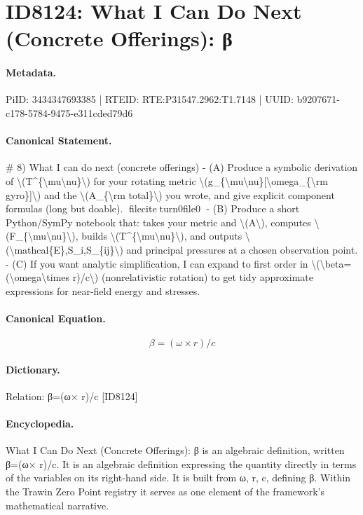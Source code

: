 \section*{ID8124: What I Can Do Next (Concrete Offerings): β}
\paragraph{Metadata.}
PiID: 3434347693385 | RTEID: RTE:P31547.2962:T1.7148 | UUID: b9207671-c178-5784-9475-e311cded79d6

\paragraph{Canonical Statement.}
\# 8) What I can do next (concrete offerings) - (A) Produce a symbolic derivation of \textbackslash{}(T\textasciicircum{}\{\textbackslash{}mu\textbackslash{}nu\}\textbackslash{}) for your rotating metric \textbackslash{}(g\_\{\textbackslash{}mu\textbackslash{}nu\}[\textbackslash{}omega\_\{\textbackslash{}rm gyro\}]\textbackslash{}) and the \textbackslash{}(A\_\{\textbackslash{}rm total\}\textbackslash{}) you wrote, and give explicit component formulas (long but doable). fileciteturn0file0 - (B) Produce a short Python/SymPy notebook that: takes your metric and \textbackslash{}(A\textbackslash{}), computes \textbackslash{}(F\_\{\textbackslash{}mu\textbackslash{}nu\}\textbackslash{}), builds \textbackslash{}(T\textasciicircum{}\{\textbackslash{}mu\textbackslash{}nu\}\textbackslash{}), and outputs \textbackslash{}(\textbackslash{}mathcal\{E\},S\_i,S\_\{ij\}\textbackslash{}) and principal pressures at a chosen observation point. - (C) If you want analytic simplification, I can expand to first order in \textbackslash{}(\textbackslash{}beta=(\textbackslash{}omega\textbackslash{}times r)/c\textbackslash{}) (nonrelativistic rotation) to get tidy approximate expressions for near-field energy and stresses.

\paragraph{Canonical Equation.}
\[
\beta=(\omega\times r)/c
\]

\paragraph{Dictionary.}
Relation: β=(ω× r)/c [ID8124]

\paragraph{Encyclopedia.}
What I Can Do Next (Concrete Offerings): β is an algebraic definition, written β=(ω× r)/c. It is an algebraic definition expressing the quantity directly in terms of the variables on its right-hand side. It is built from ω, r, c, defining β. Within the Trawin Zero Point registry it serves as one element of the framework's mathematical narrative.
